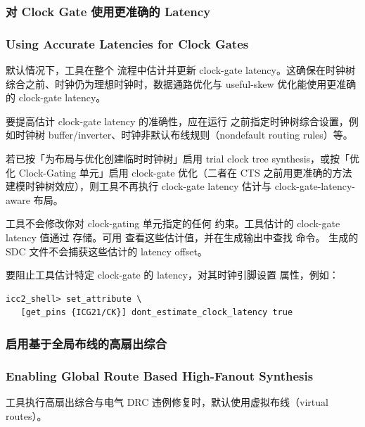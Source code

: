 \subsubsection{对 Clock Gate 使用更准确的 Latency}
\subsubsection*{Using Accurate Latencies for Clock Gates}

默认情况下，工具在整个  流程中估计并更新 clock-gate latency。这确保在时钟树综合之前、时钟仍为理想时钟时，数据通路优化与 useful-skew 优化能使用更准确的 clock-gate latency。

要提高估计 clock-gate latency 的准确性，应在运行  之前指定时钟树综合设置，例如时钟树 buffer/inverter、时钟非默认布线规则（nondefault routing rules）等。

\begin{noteBox}
若已按「为布局与优化创建临时时钟树」启用 trial clock tree synthesis，或按「优化 Clock-Gating 单元」启用 clock-gate 优化（二者在 CTS 之前用更准确的方法建模时钟树效应），则工具不再执行 clock-gate latency 估计与 clock-gate-latency-aware 布局。
\end{noteBox}

工具不会修改你对 clock-gating 单元指定的任何  约束。工具估计的 clock-gate latency 值通过  存储。可用  查看这些估计值，并在生成输出中查找  命令。 生成的 SDC 文件不会捕获这些估计的 latency offset。

要阻止工具估计特定 clock-gate 的 latency，对其时钟引脚设置  属性，例如：
\begin{lstlisting}
icc2_shell> set_attribute \
   [get_pins {ICG21/CK}] dont_estimate_clock_latency true
\end{lstlisting}

\subsubsection{启用基于全局布线的高扇出综合}
\subsubsection*{Enabling Global Route Based High-Fanout Synthesis}

工具执行高扇出综合与电气 DRC 违例修复时，默认使用虚拟布线（virtual routes）。

